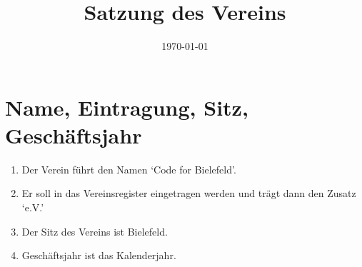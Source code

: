 \documentclass[12pt,a4paper,draft]{article}
\title{Satzung des Vereins \unsername} %
\author{\unsername}
\date{\today}
\newcommand{\unsername}{Code for Bielefeld}
\begin{document}
\maketitle
\tableofcontents

\section{Name, Eintragung, Sitz, Geschäftsjahr}
\begin{enumerate}
\item Der Verein führt den Namen `\unsername'.

\item Er soll in das Vereinsregister eingetragen werden und trägt dann den 
Zusatz `e.V.'

\item Der Sitz des Vereins ist Bielefeld. %

\item Geschäftsjahr ist das Kalenderjahr.
\end{enumerate}
\end{document}
